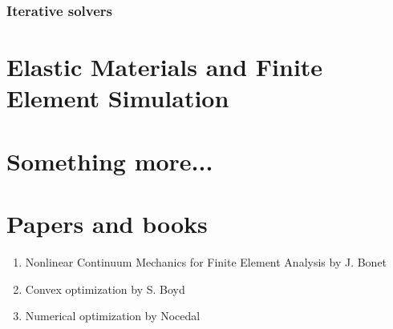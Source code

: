 \documentclass{fancydoc}
\begin{document}
\subsubsection{Iterative solvers}

\section{Elastic Materials and Finite Element Simulation}

\section{Something more...}

\section{Papers and books}
\begin{enumerate}
	\item Nonlinear Continuum Mechanics for Finite Element Analysis by J. Bonet
	\item Convex optimization by S. Boyd
	\item Numerical optimization by Nocedal
\end{enumerate}
\end{document}
